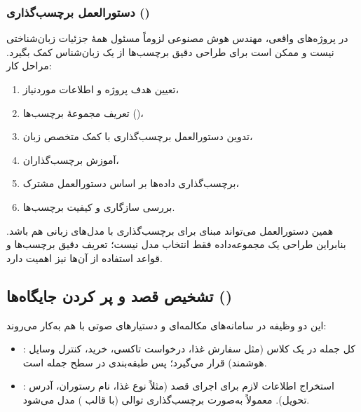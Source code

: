 \subsubsection{دستورالعمل برچسب‌گذاری ()}
در پروژه‌های واقعی، مهندس هوش مصنوعی لزوماً مسئول همهٔ جزئیات زبان‌شناختی نیست و ممکن است برای طراحی دقیق برچسب‌ها از یک زبان‌شناس کمک بگیرد. مراحل کار:
\begin{enumerate}
  \item تعیین هدف پروژه و اطلاعات موردنیاز،
  \item تعریف مجموعهٔ برچسب‌ها ()،
  \item تدوین دستورالعمل برچسب‌گذاری با کمک متخصص زبان،
  \item آموزش برچسب‌گذاران،
  \item برچسب‌گذاری داده‌ها بر اساس دستورالعمل مشترک،
  \item بررسی سازگاری و کیفیت برچسب‌ها.
\end{enumerate}
همین دستورالعمل می‌تواند مبنای  برای برچسب‌گذاری با مدل‌های زبانی هم باشد. بنابراین طراحی یک مجموعه‌داده فقط انتخاب مدل نیست؛ تعریف دقیق برچسب‌ها و قواعد استفاده از آن‌ها نیز اهمیت دارد.

\subsection{تشخیص قصد و پر کردن جایگاه‌ها ()}
این دو وظیفه در سامانه‌های مکالمه‌ای و دستیارهای صوتی با هم به‌کار می‌روند:
\begin{itemize}
  \item {}: کل جمله در یک کلاس (مثل سفارش غذا، درخواست تاکسی، خرید، کنترل وسایل هوشمند) قرار می‌گیرد؛ پس طبقه‌بندی در سطح جمله است.
  \item {}: استخراج اطلاعات لازم برای اجرای قصد (مثلاً نوع غذا، نام رستوران، آدرس تحویل).  معمولاً به‌صورت برچسب‌گذاری توالی (با قالب ) مدل می‌شود.
\end{itemize}

